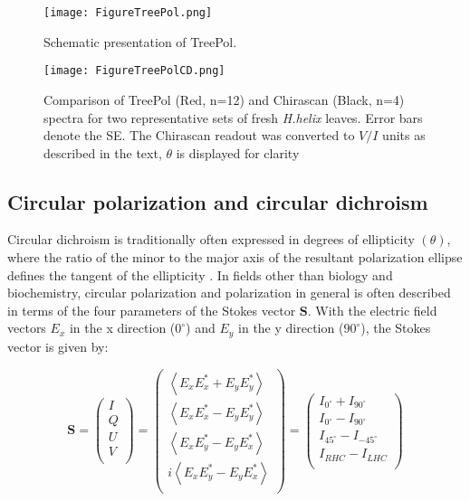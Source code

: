 \documentclass[review]{elsarticle}
\begin{document}
\begin{figure*}[ht]
  \centering
  \texttt{[image: FigureTreePol.png]}
  \caption{Schematic presentation of TreePol.}
  \label{fig:TreePol}
\end{figure*}

\begin{figure*}[h]
  \centering
  \texttt{[image: FigureTreePolCD.png]}
  \caption{Comparison of TreePol (Red, n=12) and Chirascan (Black, n=4) spectra for two representative sets of fresh \textit{H.helix} leaves. Error bars denote the SE. The Chirascan readout was converted to $V/I$ units as described in the text, $\theta$ is displayed for clarity}
  \label{fig:TreePolCD}
\end{figure*}


\subsection{Circular polarization and circular dichroism} \label{sec:CPCD}
Circular dichroism is traditionally often expressed in degrees of ellipticity $(\theta)$, where the ratio of the minor to the major axis of the resultant polarization ellipse defines the tangent of the ellipticity \cite{Fasman2013}. In fields other than biology and biochemistry, circular polarization and polarization in general is often described in terms of the four parameters of the Stokes vector $\textbf{S}$. With the electric field vectors $E_{x}$ in the x direction ($0^{\circ}$) and $E_{y}$ in the y direction ($90^{\circ}$), the Stokes vector is given by: 

\begin{equation*}
\textbf{S}=
\begin{pmatrix}
    I\\
    Q\\
    U\\
    V\\
\end{pmatrix}=
\begin{pmatrix}
    \left\langle E^{}_{x}E^{*}_{x} + E^{}_{y}E^{*}_{y}\right\rangle\\
    \left\langle E^{}_{x}E^{*}_{x} - E^{}_{y}E^{*}_{y}\right\rangle\\
    \left\langle E^{}_{x}E^{*}_{y} - E^{}_{y}E^{*}_{x}\right\rangle\\
    i\left\langle E^{}_{x}E^{*}_{y} - E^{}_{y}E^{*}_{x}\right\rangle\\
\end{pmatrix}=
\begin{pmatrix}
    I_{0^{\circ}}+I_{90^{\circ}}\\
    I_{0^{\circ}}-I_{90^{\circ}}\\
    I_{45^{\circ}}-I_{-45^{\circ}}\\
    I_{RHC}-I_{LHC}\\
\end{pmatrix}
\end{equation*}
\end{document}
